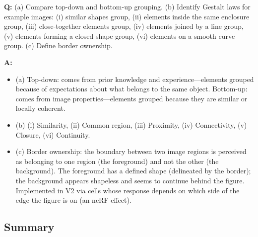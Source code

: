 \begin{exbox}
\textbf{Q:} (a) Compare top-down and bottom-up grouping. (b) Identify Gestalt laws for example images: (i) similar shapes group, (ii) elements inside the same enclosure group, (iii) close-together elements group, (iv) elements joined by a line group, (v) elements forming a closed shape group, (vi) elements on a smooth curve group. (c) Define border ownership.

\textbf{A:}
\begin{itemize}
  \item (a) Top-down: comes from prior knowledge and experience---elements grouped because of expectations about what belongs to the same object. Bottom-up: comes from image properties---elements grouped because they are similar or locally coherent.
  \item (b) (i) Similarity, (ii) Common region, (iii) Proximity, (iv) Connectivity, (v) Closure, (vi) Continuity.
  \item (c) Border ownership: the boundary between two image regions is perceived as belonging to one region (the foreground) and not the other (the background). The foreground has a defined shape (delineated by the border); the background appears shapeless and seems to continue behind the figure. Implemented in V2 via cells whose response depends on which side of the edge the figure is on (an ncRF effect).
\end{itemize}
\end{exbox}

\bigseparator

\subsection{Summary}

